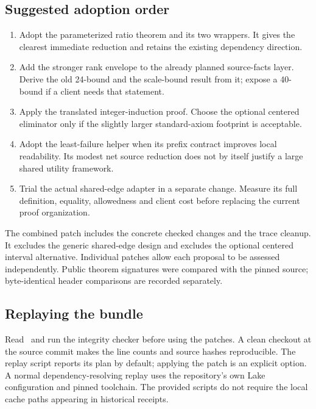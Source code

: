 \documentclass[11pt,a4paper]{article}
\begin{document}
\subsection{Suggested adoption order}

\begin{enumerate}
\item Adopt the parameterized ratio theorem and its two wrappers. It gives the clearest immediate reduction and retains the existing dependency direction.
\item Add the stronger rank envelope to the already planned source-facts layer. Derive the old 24-bound and the scale-bound result from it; expose a 40-bound if a client needs that statement.
\item Apply the translated integer-induction proof. Choose the optional centered eliminator only if the slightly larger standard-axiom footprint is acceptable.
\item Adopt the least-failure helper when its prefix contract improves local readability. Its modest net source reduction does not by itself justify a large shared utility framework.
\item Trial the actual shared-edge adapter in a separate change. Measure its full definition, equality, allowedness and client cost before replacing the current proof organization.
\end{enumerate}

The combined patch includes the concrete checked changes and the trace cleanup. It excludes the generic shared-edge design and excludes the optional centered interval alternative. Individual patches allow each proposal to be assessed independently. Public theorem signatures were compared with the pinned source; byte-identical header comparisons are recorded separately.

\subsection{Replaying the bundle}

Read \  and run the integrity checker before using the patches. A clean checkout at the source commit makes the line counts and source hashes reproducible. The replay script reports its plan by default; applying the patch is an explicit option. A normal dependency-resolving replay uses the repository's own Lake configuration and pinned toolchain. The provided scripts do not require the local cache paths appearing in historical receipts.
\end{document}
